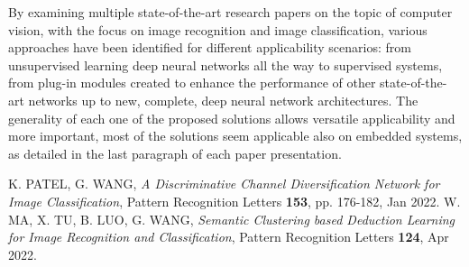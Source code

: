 \documentclass[11pt, a4paper, oneside, pdftex]{research_paper}
\begin{document}
\hspace{30mm} By examining multiple state-of-the-art research papers on the topic of computer vision, with the focus on image recognition and image classification, various approaches have been identified for different applicability scenarios: from unsupervised learning deep neural networks all the way to supervised systems, from plug-in modules created to enhance the performance of other state-of-the-art networks up to new, complete,  deep neural network architectures. The generality of each one of the proposed solutions allows versatile applicability and more important, most of the solutions seem applicable also on embedded systems, as detailed in the last paragraph of each paper presentation.

\begin{thebibliography}{24}

	K. PATEL, G. WANG, \textit{A Discriminative Channel Diversification Network for Image Classification}, Pattern Recognition Letters \textbf{153}, pp. 176-182, Jan 2022.
	W. MA, X. TU, B. LUO, G. WANG, \textit{Semantic Clustering based Deduction Learning for Image Recognition and Classification}, Pattern Recognition Letters \textbf{124}, Apr 2022.
\end{thebibliography}
\end{document}
